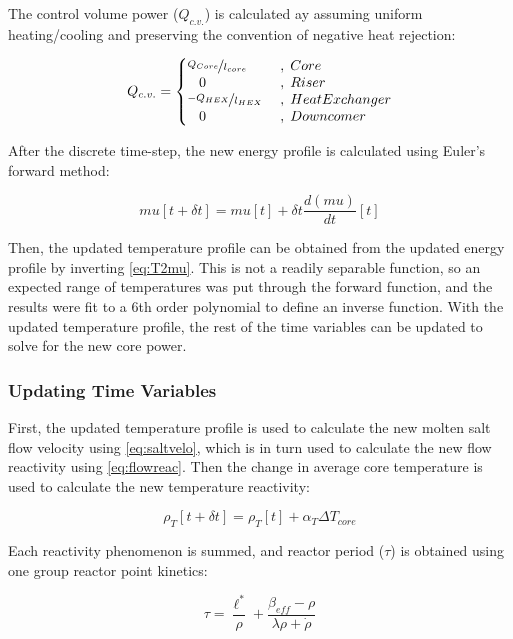 The control volume power  ($Q_{c.v.}$) is calculated ay assuming uniform heating/cooling and preserving the convention of negative heat rejection:

\begin{equation}
    Q_{c.v.} = \left\{ 
        \begin{matrix*}[l]
            \nicefrac{Q_{Core}}{l_{core}} &\;,\; Core\\
            \;\;\;0                       &\;,\; Riser\\
            \nicefrac{-Q_{HEX}}{l_{HEX}}  &\;,\; Heat Exchanger\\
            \;\;\;0                       &\;,\; Downcomer
        \end{matrix*}
    \right.
\end{equation}

After the discrete time-step, the new energy profile is calculated using Euler's forward method:

\begin{equation}
    mu[t+\delta t] = mu[t] + \delta t\frac{d(mu)}{dt}[t]
\end{equation}

Then, the updated temperature profile can be obtained from the updated energy profile by inverting \ref{eq:T2mu}. This is not a readily separable function, so an expected range of temperatures was put through the forward function, and the results were fit to a 6th order polynomial to define an inverse function. With the updated temperature profile, the rest of the time variables can be updated to solve for the new core power.

\subsubsection{Updating Time Variables}
First, the updated temperature profile is used to calculate the new molten salt flow velocity using \ref{eq:saltvelo}, which is in turn used to calculate the new flow reactivity using \ref{eq:flowreac}. Then the change in average core temperature is used to calculate the new temperature reactivity:

\begin{equation}
    \rho_T[t+\delta t] = \rho_T[t] + \alpha_T\Delta T_{core}
\end{equation}

Each reactivity phenomenon is summed, and reactor period ($\tau$) is obtained using one group reactor point kinetics:

\begin{equation}
    \tau = \frac{\ell^{*}}{\rho}
         +\frac{\beta_{eff}-\rho}{\lambda\rho + \dot{\rho}}
\end{equation}

